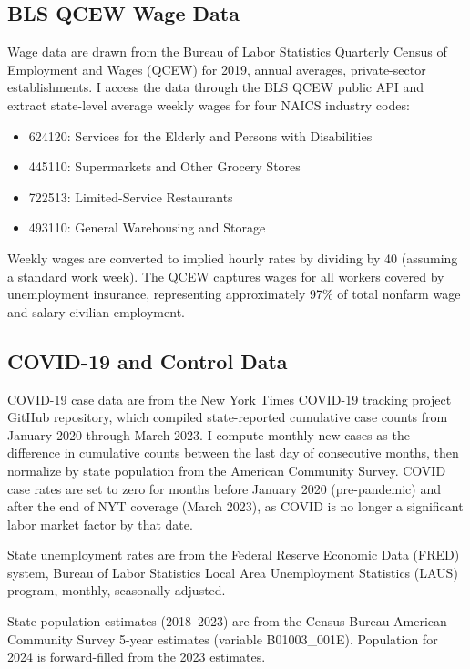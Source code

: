 \documentclass[12pt]{article}
\begin{document}
\subsection{BLS QCEW Wage Data}

Wage data are drawn from the Bureau of Labor Statistics Quarterly Census of Employment and Wages (QCEW) for 2019, annual averages, private-sector establishments. I access the data through the BLS QCEW public API and extract state-level average weekly wages for four NAICS industry codes:

\begin{itemize}
\item 624120: Services for the Elderly and Persons with Disabilities
\item 445110: Supermarkets and Other Grocery Stores
\item 722513: Limited-Service Restaurants
\item 493110: General Warehousing and Storage
\end{itemize}

Weekly wages are converted to implied hourly rates by dividing by 40 (assuming a standard work week). The QCEW captures wages for all workers covered by unemployment insurance, representing approximately 97\% of total nonfarm wage and salary civilian employment.

\subsection{COVID-19 and Control Data}

COVID-19 case data are from the New York Times COVID-19 tracking project GitHub repository, which compiled state-reported cumulative case counts from January 2020 through March 2023. I compute monthly new cases as the difference in cumulative counts between the last day of consecutive months, then normalize by state population from the American Community Survey. COVID case rates are set to zero for months before January 2020 (pre-pandemic) and after the end of NYT coverage (March 2023), as COVID is no longer a significant labor market factor by that date.

State unemployment rates are from the Federal Reserve Economic Data (FRED) system, Bureau of Labor Statistics Local Area Unemployment Statistics (LAUS) program, monthly, seasonally adjusted.

State population estimates (2018--2023) are from the Census Bureau American Community Survey 5-year estimates (variable B01003\_001E). Population for 2024 is forward-filled from the 2023 estimates.
\end{document}
